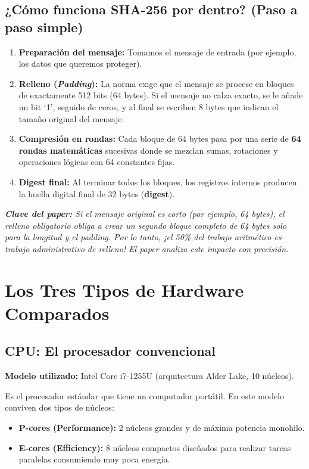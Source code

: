 \documentclass[11pt,a4paper]{article}
\newcommand{\destacado}[1]{%
    \par\vspace{0.8em}%
    \noindent\colorbox{boxbg}{%
        \parbox{\dimexpr\textwidth-2\fboxsep\relax}{%
            \vspace{0.4em}%
            \raggedright\itshape #1%
            \vspace{0.4em}%
        }%
    }%
    \par\vspace{0.8em}%
}
\begin{document}
\subsection{¿Cómo funciona SHA-256 por dentro? (Paso a paso simple)}
\begin{enumerate}[leftmargin=*]
    \item \textbf{Preparación del mensaje:} Tomamos el mensaje de entrada (por ejemplo, los datos que queremos proteger).
    \item \textbf{Relleno (\emph{Padding}):} La norma exige que el mensaje se procese en bloques de exactamente 512 bits (64 bytes). Si el mensaje no calza exacto, se le añade un bit `1', seguido de ceros, y al final se escriben 8 bytes que indican el tamaño original del mensaje.
    \item \textbf{Compresión en rondas:} Cada bloque de 64 bytes pasa por una serie de \textbf{64 rondas matemáticas} sucesivas donde se mezclan sumas, rotaciones y operaciones lógicas con 64 constantes fijas.
    \item \textbf{Digest final:} Al terminar todos los bloques, los registros internos producen la huella digital final de 32 bytes (\textbf{digest}).
\end{enumerate}

\destacado{\textbf{Clave del paper:} Si el mensaje original es corto (por ejemplo, 64 bytes), el relleno obligatorio obliga a crear un segundo bloque completo de 64 bytes solo para la longitud y el padding. Por lo tanto, ¡el 50\% del trabajo aritmético es trabajo administrativo de relleno! El paper analiza este impacto con precisión.}

\section{Los Tres Tipos de Hardware Comparados}

\subsection{CPU: El procesador convencional}
\textbf{Modelo utilizado:} Intel Core i7-1255U (arquitectura Alder Lake, 10 núcleos).

Es el procesador estándar que tiene un computador portátil. En este modelo conviven dos tipos de núcleos:
\begin{itemize}[leftmargin=*]
    \item \textbf{P-cores (Performance):} 2 núcleos grandes y de máxima potencia monohilo.
    \item \textbf{E-cores (Efficiency):} 8 núcleos compactos diseñados para realizar tareas paralelas consumiendo muy poca energía.
\end{itemize}
\end{document}
